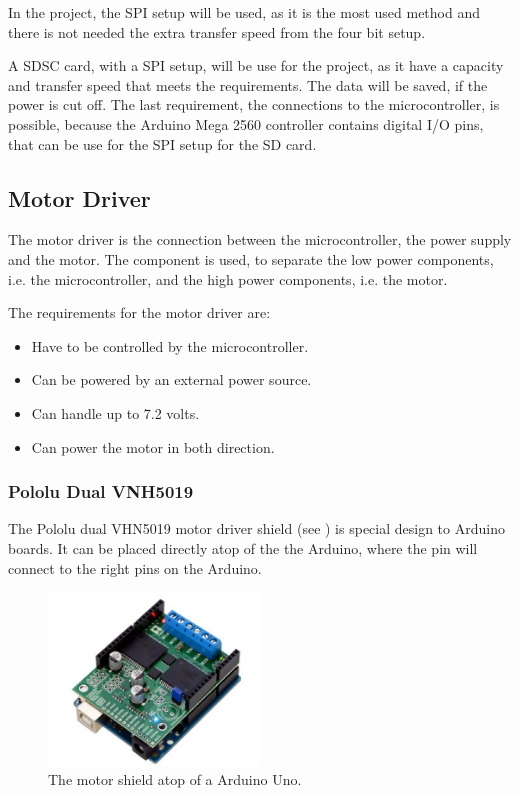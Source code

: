 In the project, the SPI setup will be used, as it is the most used method and there is not needed the extra transfer speed from the four bit setup.


A SDSC card, with a SPI setup, will be use for the project, as it have a capacity and transfer speed that meets the requirements. The data will be saved, if the power is cut off. The last requirement, the connections to the microcontroller, is possible, because the Arduino Mega 2560 controller contains  digital I/O pins, that can be use for the SPI setup for the SD card.


\subsection{Motor Driver}
The motor driver is the connection between the microcontroller, the power supply and the motor. The component is used, to separate the low power components, i.e. the microcontroller, and the high power components, i.e. the motor.

The requirements for the motor driver are:
\begin{itemize}
\item Have to be controlled by the microcontroller.
\item Can be powered by an external power source.
\item Can handle up to 7.2 volts.
\item Can power the motor in both direction.
\end{itemize}

\subsubsection{Pololu Dual VNH5019}
The Pololu dual VHN5019 motor driver shield (see ) is special design to Arduino boards. It can be placed directly atop of the the Arduino, where the pin will connect to the right pins on the Arduino. 

\begin{figure}[H]
	\centering
	\includegraphics[width=0.50\textwidth]{figures/Motordriver}
		\caption{The motor shield atop of a Arduino Uno.} 
	\label{MotorDrive}
\end{figure}


